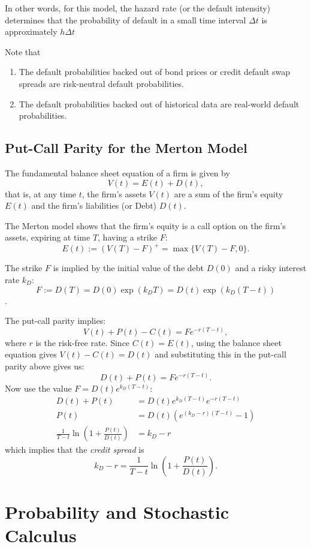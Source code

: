 \documentclass{amsart}
\theoremstyle{plain}
\numberwithin{equation}{section}
\begin{document}
In other words, for this model, the hazard rate (or the default intensity) determines that the probability of 
default in a small time interval $\Delta t$ is approximately 
$h \Delta t$

Note that 
\begin{enumerate}
	\item The default probabilities backed out of bond prices or credit default 
	swap spreads are risk-neutral default probabilities.
	\item The default probabilities backed out of historical data are 
	real-world default probabilities.
\end{enumerate}

\subsection{Put-Call Parity for the Merton Model}
The fundamental balance sheet equation of a firm
is given by
$$V(t) = E(t) + D(t),$$
that is, at any time $t$, the firm's assets $V(t)$ are 
a sum of the firm's equity $E(t)$ and the firm's 
liabilities (or Debt)  $D(t)$.

The Merton model shows that the firm's equity is 
a call option on the firm's assets, expiring at 
time $T$, having a strike $F$:
$$E(t)  := \left(V(T) - F\right)^{+}= \max\{V(T)-F,0\}.$$

The strike $F$ is implied by the initial value of the 
debt $D(0)$ and a risky interest rate $k_D$:
$$F := D(T) = D(0)\exp(k_DT) = D(t)\exp(k_D(T-t))$$.

The put-call parity implies:
$$V(t) + P(t) - C(t) = F e^{-r(T-t)},$$
where $r$ is the risk-free rate.
Since $C(t) = E(t)$, using the balance 
sheet equation gives $V(t)-C(t)=D(t)$ and 
substituting this in the put-call parity 
above gives us:
$$D(t) + P(t) = F e^{-r(T-t)}.$$
Now use the value $F = D(t) e^{k_D(T-t)}$:
\begin{align*}
D(t) + P(t) &= D(t) e^{k_D(T-t)} e^{-r(T-t)}\\
P(t) &= D(t)\left(e^{(k_D-r)(T-t)} - 1\right)\\
\frac{1}{T-t}\ln\left(1+\frac{P(t)}{D(t)}\right) &= k_D-r
\end{align*}
which implies that the \emph{credit spread} 
is 
$$k_D - r = \frac{1}{T-t}\ln\left(1+\frac{P(t)}{D(t)}\right).$$

\section{Probability and Stochastic Calculus}
\end{document}
